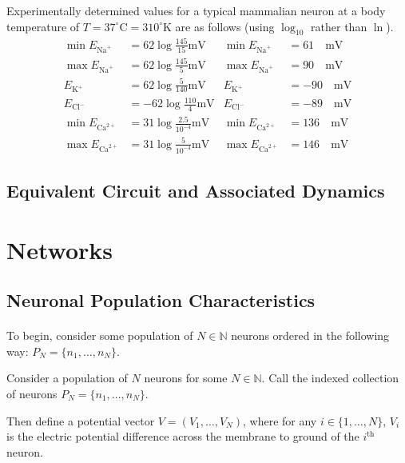 \documentclass{article}
\begin{document}
Experimentally determined values for a typical mammalian neuron at a body temperature of $T=37^{\circ}\text{C} = 310^{\circ}\text{K}$ are as follows (using $\log_{10}$ rather than $\ln$).
\begin{align*}
\min E_{\text{Na}^{+}} &= 62 \log \frac{145}{15} \text{mV} &\min E_{\text{Na}^{+}} &= 61 \quad \text{mV} \\
\max E_{\text{Na}^{+}} &= 62 \log \frac{145}{5} \text{mV} &\max E_{\text{Na}^{+}} &= 90 \quad \text{mV} \\
E_{\text{K}^{+}} &= 62 \log \frac{5}{140} \text{mV} &E_{\text{K}^{+}} &= -90 \quad \text{mV} \\
E_{\text{Cl}^{-}} &= -62 \log \frac{110}{4} \text{mV} &E_{\text{Cl}^{-}} &= -89 \quad \text{mV} \\
\min E_{\text{Ca}^{2+}} &= 31 \log \frac{2.5}{10^{-4}} \text{mV} &\min E_{\text{Ca}^{2+}} &= 136 \quad \text{mV} \\
\max E_{\text{Ca}^{2+}} &= 31 \log \frac{5}{10^{-4}} \text{mV} &\max E_{\text{Ca}^{2+}} &= 146 \quad \text{mV}
\end{align*}

\subsection{Equivalent Circuit and Associated Dynamics}

\section{Networks}

\subsection{Neuronal Population Characteristics}

\paragraph{}
To begin, consider some population of $N\in\mathbb{N}$ neurons ordered in the following way: $P_{N} = \{ n_{1}, \dots, n_{N} \}$.
\begin{definition}[$P =$ \textbf{neuron population}]\label{P}
Consider a population of $N$ neurons for some $N\in\mathbb{N}$. Call the indexed collection of neurons $P_{N} = \{ n_{1}, \dots, n_{N} \}$.
\end{definition}

Then define a potential vector $V = ( V_{1}, \dots, V_{N} )$, where for any $i \in \{ 1, \dots, N \}$, $V_{i}$ is the electric potential difference across the membrane to ground of the $i^{\text{th}}$ neuron.
\end{document}

